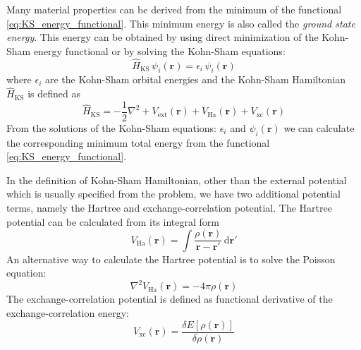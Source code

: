 Many material properties can be derived from the minimum of the
functional \eqref{eq:KS_energy_functional}. This minimum energy is also called the
\textit{ground state energy}. This energy can be obtained by using direct
minimization of the Kohn-Sham energy functional or by solving the Kohn-Sham equations:
\begin{equation}
\hat{H}_{\mathrm{KS}}\,\psi_{i}(\mathbf{r}) = \epsilon_{i}\,\psi_{i}(\mathbf{r})
\label{eq:KS_equations}
\end{equation}
%
where $\epsilon_{i}$ are the Kohn-Sham orbital energies and the
Kohn-Sham Hamiltonian $\hat{H}_{\mathrm{KS}}$ is defined as
%
\begin{equation}
\hat{H}_{\mathrm{KS}} = -\frac{1}{2}\nabla^{2} + V_{\mathrm{ext}}(\mathbf{r}) +
V_{\mathrm{Ha}}(\mathbf{r}) + V_{\mathrm{xc}}(\mathbf{r})
\label{eq:KS_hamiltonian}
\end{equation}
%
From the solutions of the Kohn-Sham equations: ${\epsilon_{i}}$ and ${\psi_{i}(\mathbf{r})}$
we can calculate the corresponding minimum total energy from the functional
\eqref{eq:KS_energy_functional}.

In the definition of Kohn-Sham Hamiltonian, other than the external potential
which is usually specified from the problem,
we have two additional potential terms, namely the Hartree and exchange-correlation
potential.
The Hartree potential can be calculated from its integral form
\begin{equation}
V_{\mathrm{Ha}}(\mathbf{r}) = \int
\frac{\rho(\mathbf{r})}{\mathbf{r} - \mathbf{r}'}\,\mathrm{d}\mathbf{r}'
\end{equation}
An alternative way to calculate the Hartree potential is to solve the Poisson equation:
\begin{equation}
\nabla^2 V_{\mathrm{Ha}}(\mathbf{r}) = -4\pi\rho(\mathbf{r})
\label{eq:poisson_eq}
\end{equation}
%
The exchange-correlation potential is defined as functional derivative of the
exchange-correlation energy:
\begin{equation}
V_{\mathrm{xc}}(\mathbf{r}) = \frac{\delta E[\rho(\mathbf{r})]}{\delta \rho(\mathbf{r})}
\end{equation}

